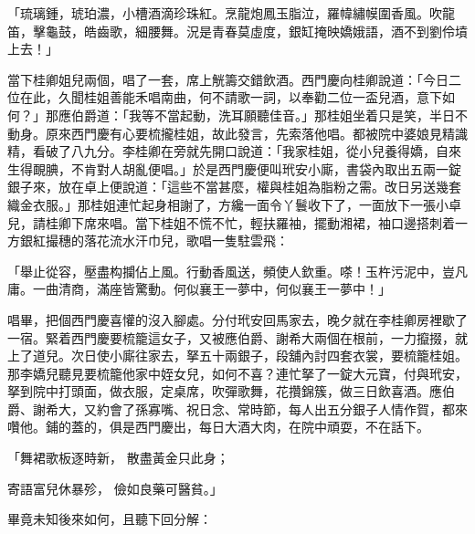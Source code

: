 「琉璃鍾，琥珀濃，小槽酒滴珍珠紅。烹龍炮鳳玉脂泣，羅幃繡幙圍香風。吹龍笛，擊龜鼓，皓齒歌，細腰舞。況是青春莫虛度，銀缸掩映嬌娥語，酒不到劉伶墳上去！」

當下桂卿姐兒兩個，唱了一套，席上觥籌交錯飲酒。西門慶向桂卿說道：「今日二位在此，久聞桂姐善能禾唱南曲，何不請歌一詞，以奉勸二位一盃兒酒，意下如何？」那應伯爵道：「我等不當起動，洗耳願聽佳音。」那桂姐坐着只是笑，半日不動身。原來西門慶有心要梳攏桂姐，故此發言，先索落他唱。都被院中婆娘見精識精，看破了八九分。李桂卿在旁就先開口說道：「我家桂姐，從小兒養得嬌，自來生得靦腆，不肯對人胡亂便唱。」於是西門慶便叫玳安小廝，書袋內取出五兩一錠銀子來，放在卓上便說道：「這些不當甚麼，權與桂姐為脂粉之需。改日另送幾套織金衣服。」那桂姐連忙起身相謝了，方纔一面令丫鬟收下了，一面放下一張小卓兒，請桂卿下席來唱。當下桂姐不慌不忙，輕扶羅袖，擺動湘裙，袖口邊搭刺着一方銀紅撮穗的落花流水汗巾兒，歌唱一隻駐雲飛：

「舉止從容，壓盡构攔佔上風。行動香風送，頻使人欽重。嗏！玉杵污泥中，豈凡庸。一曲清商，滿座皆驚動。何似襄王一夢中，何似襄王一夢中！」

唱畢，把個西門慶喜懽的沒入腳處。分付玳安回馬家去，晚夕就在李桂卿房裡歇了一宿。緊着西門慶要梳籠這女子，又被應伯爵、謝希大兩個在根前，一力攛掇，就上了道兒。次日使小廝往家去，拏五十兩銀子，段舖內討四套衣裳，要梳籠桂姐。那李嬌兒聽見要梳籠他家中姪女兒，如何不喜？連忙拏了一錠大元寶，付與玳安，拏到院中打頭面，做衣服，定桌席，吹彈歌舞，花攢錦簇，做三日飲喜酒。應伯爵、謝希大，又約會了孫寡嘴、祝日念、常時節，每人出五分銀子人情作賀，都來囋他。鋪的蓋的，俱是西門慶出，每日大酒大肉，在院中頑耍，不在話下。

「舞裙歌板逐時新，  散盡黃金只此身；

寄語富兒休暴殄，  儉如良藥可醫貧。」

畢竟未知後來如何，且聽下回分解：


